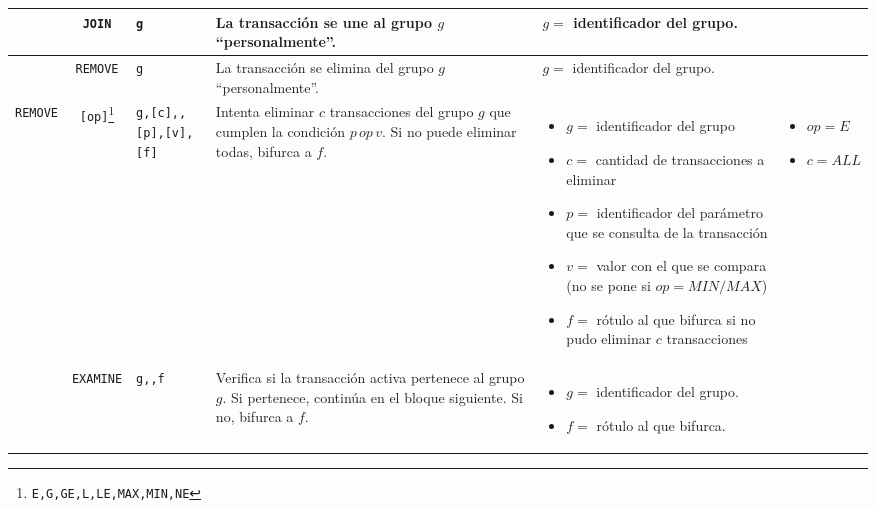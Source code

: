 \documentclass{article}
\providecommand{\tabularnewline}{\\}
\begin{document}
\begin{longtable}{|lc>{\raggedright}p{}|>{\raggedright}p{}|>{\raggedright}p{}|>{\raggedright}p{}|}
\hline
& \texttt{JOIN} & \texttt{g} &
La transacción se une al grupo $g$ ``personalmente''. &
$g=$ identificador del grupo. & \tabularnewline

\hline
& \texttt{REMOVE} & \texttt{g} &
La transacción se elimina del grupo $g$ ``personalmente''. &
$g=$ identificador del grupo. & \tabularnewline

\hline
\texttt{REMOVE} & \texttt{[op]}\footnote{\texttt{E,G,GE,L,LE,MAX,MIN,NE}} & \texttt{g,[c],,[p],[v],[f]} &
Intenta eliminar $c$ transacciones del grupo $g$ que cumplen la
condición $p\,op\,v$. Si no puede eliminar todas, bifurca a $f$. &
\begin{itemize}
  \item $g=$ identificador del grupo
  \item $c=$ cantidad de transacciones a eliminar
  \item $p=$ identificador del parámetro que se consulta de la transacción
  \item $v=$ valor con el que se compara (no se pone si $op=MIN/MAX$)
  \item $f=$ rótulo al que bifurca si no pudo eliminar $c$ transacciones
\end{itemize} &
\begin{itemize}
  \item $op=E$
  \item $c=ALL$
\end{itemize} \tabularnewline

\hline
& \texttt{EXAMINE} & \texttt{g,,f} &
Verifica si la transacción activa pertenece al grupo $g$. Si pertenece,
continúa en el bloque siguiente. Si no, bifurca a $f$. &
\begin{itemize}
  \item $g=$ identificador del grupo.
  \item $f=$ rótulo al que bifurca.
\end{itemize} & \tabularnewline


\end{longtable}
\end{document}
